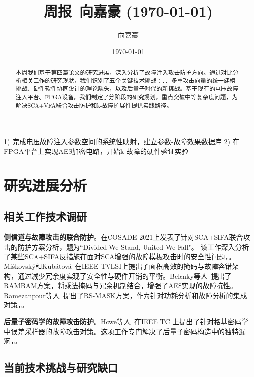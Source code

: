 \documentclass{article}
\title{周报~向嘉豪 (\today)}
\author{向嘉豪}
\date{\today}
\begin{document}
\maketitle

\begin{abstract}
本周我们基于第四篇论文的研究进展，深入分析了故障注入攻击防护方向。通过对比分析相关工作的研究现状，我们识别了五个关键技术挑战：、、多重攻击向量的统一建模挑战、硬件软件协同设计的理论缺失，以及后量子时代的新挑战。基于现有的电压故障注入平台、FPGA设备，我们制定了分阶段的研究规划，重点突破中等复杂度问题，为解决SCA+VFA联合攻击防护和k-故障扩展性提供实践路径。
\end{abstract}

\begin{weekplan}
1) 完成电压故障注入参数空间的系统性映射，建立参数-故障效果数据库
2) 在FPGA平台上实现AES加密电路，开始k-故障的硬件验证实验
\end{weekplan}

\section{研究进展分析}

\subsection{相关工作技术调研}

\textbf{侧信道与故障攻击的联合防护}。\cite{COSADE:SahBagJapMuk21}在COSADE 2021上发表了针对SCA+SIFA联合攻击的防护方案分析，题为``Divided We Stand, United We Fall"。
该工作深入分析了某些SCA+SIFA反措施在面对SCA增强的故障模板攻击时的安全性问题，。
Miškovský和Kubátová~\cite{IEEE-TVLSI:MisKub21}在IEEE TVLSI上提出了面积高效的掩码与故障容错架构，通过减少冗余度实现了安全性与硬件开销的平衡。Belenky等人~\cite{TCHES:BelBugAzr22}提出了RAMBAM方案，将乘法掩码与冗余机制结合，增强了AES实现的故障抗性。
Ramezanpour等人~\cite{IEEE-TCAD:RamAmp20}提出了RS-MASK方案，作为针对功耗分析和故障分析的集成对策，。

\textbf{后量子密码学的故障攻击防护}。Howe等人~\cite{IEEE-HOST:HowKhaMarNor19}在IEEE TC 上提出了针对格基密码学中误差采样器的故障攻击对策。这项工作专门解决了后量子密码构造中的独特漏洞，。


\subsection{当前技术挑战与研究缺口}
\end{document}
